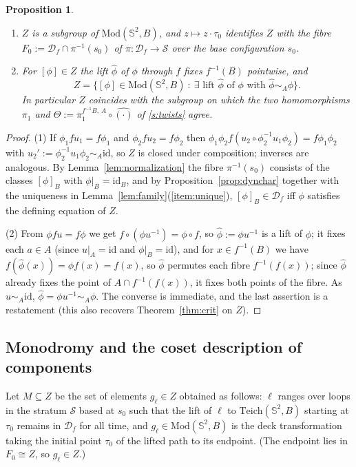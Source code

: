 \documentclass[11pt]{amsart}
\theoremstyle{plain}
\newtheorem{proposition}[theorem]{Proposition}
\theoremstyle{definition}
\newcommand{\Sph}{\mathbb{S}^2}
\newcommand{\Teich}{\mathrm{Teich}}
\newcommand{\Mod}{\mathrm{Mod}}
\newcommand{\D}{\mathcal{D}}
\newcommand{\S}{\mathcal{S}}
\newcommand{\id}{\mathrm{id}}
\begin{document}
\begin{proposition}\label{prop:fibre}
\begin{enumerate}
\item $Z$ is a subgroup of $\Mod(\Sph,B)$, and
$z\mapsto z\cdot\tau_0$ identifies $Z$ with the fibre
$F_0:=\D_f\cap\pi^{-1}(s_0)$ of $\pi:\D_f\to\S$ over the base
configuration $s_0$.
\item For $[\phi]\in Z$ the lift $\widehat\phi$ of $\phi$ through
$f$ fixes $f^{-1}(B)$ pointwise, and
$$Z=\bigl\{[\phi]\in\Mod(\Sph,B)\ :\ \exists\text{ lift }\widehat\phi
\text{ of }\phi\text{ with }\widehat\phi\sim_A\phi\bigr\}.$$
In particular $Z$ coincides with the subgroup on which the two
homomorphisms $\pi_1$ and $\Theta:=\pi_1^{f^{-1}B,\,A}\circ\widehat{(\cdot)}$
of \S\ref{s:twists} agree.
\end{enumerate}
\end{proposition}

\begin{proof}
(1) If $\phi_1 f u_1=f\phi_1$ and $\phi_2fu_2=f\phi_2$ then
$\phi_1\phi_2 f(u_2\circ\phi_2^{-1}u_1\phi_2)=f\phi_1\phi_2$ with
$u_2':=\phi_2^{-1}u_1\phi_2\sim_A\id$, so $Z$ is closed under composition;
inverses are analogous.  By Lemma~\ref{lem:normalization} the fibre
$\pi^{-1}(s_0)$ consists of the classes $[\phi]_B$ with
$\phi|_B=\id_B$, and by Proposition~\ref{prop:dynchar} together with the
uniqueness in Lemma~\ref{lem:family}(\ref{item:unique}),
$[\phi]_B\in\D_f$ iff $\phi$ satisfies the defining equation of $Z$.

(2) From $\phi fu=f\phi$ we get $f\circ(\phi u^{-1})=\phi\circ f$, so
$\widehat\phi:=\phi u^{-1}$ is a lift of $\phi$; it fixes each $a\in A$
(since $u|_A=\id$ and $\phi|_B=\id$), and for $x\in f^{-1}(B)$ we have
$f(\widehat\phi(x))=\phi f(x)=f(x)$, so $\widehat\phi$ permutes each fibre
$f^{-1}(f(x))$; since $\widehat\phi$ already fixes the point of
$A\cap f^{-1}(f(x))$, it fixes both points of the fibre.  As
$u\sim_A\id$, $\widehat\phi=\phi u^{-1}\sim_A\phi$.  The converse is
immediate, and the last assertion is a restatement (this also recovers
Theorem~\ref{thm:crit} on $Z$).
\end{proof}

\subsection{Monodromy and the coset description of components}

Let $M\subseteq Z$ be the set of elements $g_\ell\in Z$ obtained as
follows: $\ell$ ranges over loops in the stratum $\S$ based at $s_0$ such
that the lift of $\ell$ to $\Teich(\Sph,B)$ starting at $\tau_0$ remains
in $\D_f$ for all time, and $g_\ell\in\Mod(\Sph,B)$ is the deck
transformation taking the initial point $\tau_0$ of the lifted path to its
endpoint.  (The endpoint lies in $F_0\cong Z$, so $g_\ell\in Z$.)
\end{document}
